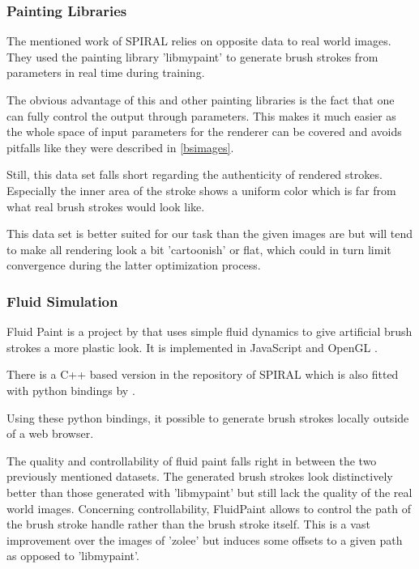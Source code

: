 \subsubsection{Painting Libraries}

The mentioned work of SPIRAL  relies on opposite data to real world
images.
They used the painting library 'libmypaint' \cite{libmypaint} to generate brush strokes
from parameters in real time during training.

The obvious advantage of this and other painting libraries is the fact that one
can fully control the output through parameters.
This makes it much easier as the whole space of input parameters for the renderer
can be covered and avoids pitfalls like they were described in \ref{bsimages}.

Still, this data set falls short regarding the authenticity of rendered strokes.
Especially the inner area of the stroke shows a uniform color which is far from
what real brush strokes would look like.

This data set is better suited for our task than the given images are but will tend
to make all rendering look a bit 'cartoonish' or flat, which could in turn limit
convergence during the latter optimization process.

\subsubsection{Fluid Simulation}

Fluid Paint  is a project by  that uses simple
fluid dynamics to give artificial brush strokes a more plastic look.
It is implemented in JavaScript and OpenGL .

There is a C++ based version in the repository of SPIRAL which is also fitted with
python bindings by .

Using these python bindings, it possible to generate brush strokes locally outside
of a web browser.

The quality and controllability of fluid paint falls right in between the two previously
mentioned datasets.
The generated brush strokes look distinctively better than those generated with 'libmypaint'
but still lack the quality of the real world images.
Concerning controllability, FluidPaint allows to control the path of the brush stroke
handle rather than the brush stroke itself.
This is a vast improvement over the images of 'zolee' but induces some offsets to
a given path as opposed to 'libmypaint'.

